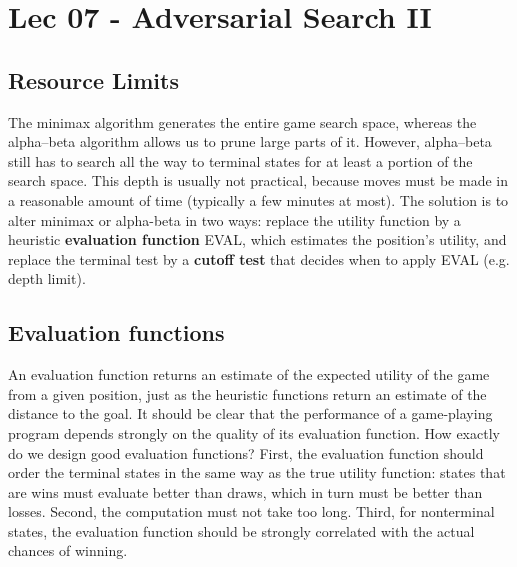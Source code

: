 \chapter{Lec 07 - Adversarial Search II}
\section{Resource Limits}
The minimax algorithm generates the entire game search space, whereas the alpha–beta algorithm allows us to prune large parts of it. However, alpha–beta still has to search all the way to terminal states for at least a portion of the search space. This depth is usually not practical, because moves must be made in a reasonable amount of time (typically a few minutes at most). The solution is to alter minimax or alpha-beta in two ways: replace the utility function by a heuristic \textbf{evaluation function} EVAL, which estimates the position’s utility, and replace the terminal test by a \textbf{cutoff test} that decides when to apply EVAL (e.g. depth limit).

\section{Evaluation functions}
An evaluation function returns an estimate of the expected utility of the game from a given position, just as the heuristic functions return an estimate of the distance to the goal. It should be clear that the performance of a game-playing program depends strongly on the quality of its evaluation function. How exactly do we design good evaluation functions?\newline\newline
First, the evaluation function should order the terminal states in the same way as the true utility function: states that are wins must evaluate better than draws, which in turn must be better than losses. Second, the computation must not take too long. Third, for nonterminal states, the evaluation function should be strongly correlated with the actual chances of winning.


